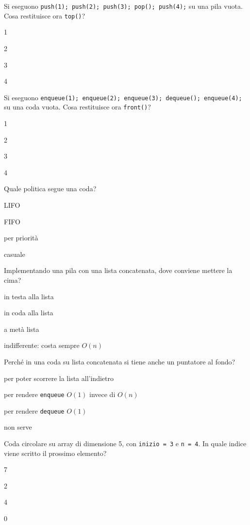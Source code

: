 \begin{quiz}{Si eseguono \texttt{push(1); push(2); push(3); pop(); push(4);} su una pila vuota. Cosa restituisce ora \texttt{top()}?}
  \item 1
  \item 2
  \item 3
  \item 4
\end{quiz}

\begin{quiz}{Si eseguono \texttt{enqueue(1); enqueue(2); enqueue(3); dequeue(); enqueue(4);} su una coda vuota. Cosa restituisce ora \texttt{front()}?}
  \item 1
  \item 2
  \item 3
  \item 4
\end{quiz}

\begin{quiz}{Quale politica segue una coda?}
  \item LIFO
  \item FIFO
  \item per priorità
  \item casuale
\end{quiz}

\begin{quiz}{Implementando una pila con una lista concatenata, dove conviene mettere la cima?}
  \item in testa alla lista
  \item in coda alla lista
  \item a metà lista
  \item indifferente: costa sempre $O(n)$
\end{quiz}

\begin{quiz}{Perché in una coda su lista concatenata si tiene anche un puntatore al fondo?}
  \item per poter scorrere la lista all'indietro
  \item per rendere \texttt{enqueue} $O(1)$ invece di $O(n)$
  \item per rendere \texttt{dequeue} $O(1)$
  \item non serve
\end{quiz}

\begin{quiz}{Coda circolare su array di dimensione 5, con \texttt{inizio = 3} e \texttt{n = 4}. In quale indice viene scritto il prossimo elemento?}
  \item 7
  \item 2
  \item 4
  \item 0
\end{quiz}

